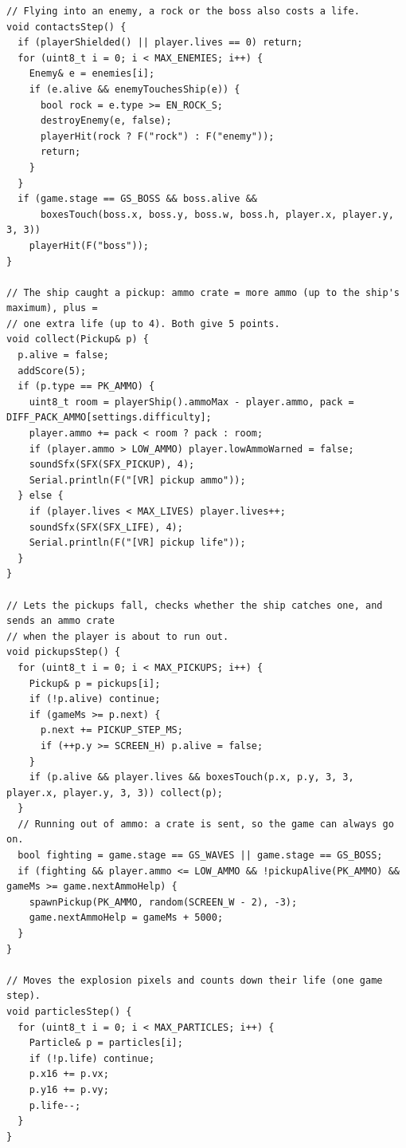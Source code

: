 \documentclass[11pt,a4paper]{article}
\begin{document}
\begin{lstlisting}[language=Arduino]
// Flying into an enemy, a rock or the boss also costs a life.
void contactsStep() {
  if (playerShielded() || player.lives == 0) return;
  for (uint8_t i = 0; i < MAX_ENEMIES; i++) {
    Enemy& e = enemies[i];
    if (e.alive && enemyTouchesShip(e)) {
      bool rock = e.type >= EN_ROCK_S;
      destroyEnemy(e, false);
      playerHit(rock ? F("rock") : F("enemy"));
      return;
    }
  }
  if (game.stage == GS_BOSS && boss.alive &&
      boxesTouch(boss.x, boss.y, boss.w, boss.h, player.x, player.y, 3, 3))
    playerHit(F("boss"));
}

// The ship caught a pickup: ammo crate = more ammo (up to the ship's maximum), plus =
// one extra life (up to 4). Both give 5 points.
void collect(Pickup& p) {
  p.alive = false;
  addScore(5);
  if (p.type == PK_AMMO) {
    uint8_t room = playerShip().ammoMax - player.ammo, pack = DIFF_PACK_AMMO[settings.difficulty];
    player.ammo += pack < room ? pack : room;
    if (player.ammo > LOW_AMMO) player.lowAmmoWarned = false;
    soundSfx(SFX(SFX_PICKUP), 4);
    Serial.println(F("[VR] pickup ammo"));
  } else {
    if (player.lives < MAX_LIVES) player.lives++;
    soundSfx(SFX(SFX_LIFE), 4);
    Serial.println(F("[VR] pickup life"));
  }
}

// Lets the pickups fall, checks whether the ship catches one, and sends an ammo crate
// when the player is about to run out.
void pickupsStep() {
  for (uint8_t i = 0; i < MAX_PICKUPS; i++) {
    Pickup& p = pickups[i];
    if (!p.alive) continue;
    if (gameMs >= p.next) {
      p.next += PICKUP_STEP_MS;
      if (++p.y >= SCREEN_H) p.alive = false;
    }
    if (p.alive && player.lives && boxesTouch(p.x, p.y, 3, 3, player.x, player.y, 3, 3)) collect(p);
  }
  // Running out of ammo: a crate is sent, so the game can always go on.
  bool fighting = game.stage == GS_WAVES || game.stage == GS_BOSS;
  if (fighting && player.ammo <= LOW_AMMO && !pickupAlive(PK_AMMO) && gameMs >= game.nextAmmoHelp) {
    spawnPickup(PK_AMMO, random(SCREEN_W - 2), -3);
    game.nextAmmoHelp = gameMs + 5000;
  }
}

// Moves the explosion pixels and counts down their life (one game step).
void particlesStep() {
  for (uint8_t i = 0; i < MAX_PARTICLES; i++) {
    Particle& p = particles[i];
    if (!p.life) continue;
    p.x16 += p.vx;
    p.y16 += p.vy;
    p.life--;
  }
}


\end{lstlisting}
\end{document}
